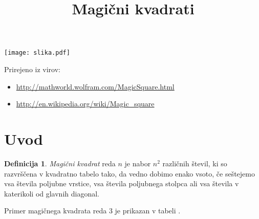 \documentclass[a4paper,12pt]{article}
\title{Magični kvadrati}
\date{}
\newcommand{\pojem}[1]{\emph{\color{purple}#1}}
\theoremstyle{plain}
\theoremstyle{definition}
\newtheorem{definicija}{Definicija}
\theoremstyle{proof}
\begin{document}
\maketitle

\begin{center}
   \texttt{[image: slika.pdf]}
\end{center}

Prirejeno iz virov:


\begin{itemize}
   \item \url{http://mathworld.wolfram.com/MagicSquare.html}
   \item \url{http://en.wikipedia.org/wiki/Magic_square}
\end{itemize}


\tableofcontents


\newpage

\section{Uvod}

\begin{definicija}
   \pojem{Magični kvadrat} reda $n$ je nabor $n^2$ različnih števil,
   ki so razvrščena v kvadratno tabelo tako, da vedno dobimo enako vsoto,
   če seštejemo vsa števila poljubne vrstice, vsa števila poljubnega
   stolpca ali vsa števila v katerikoli od glavnih diagonal.
 \end{definicija}

Primer magičnega kvadrata reda 3 je prikazan v tabeli \cite{ref}.
\end{document}
